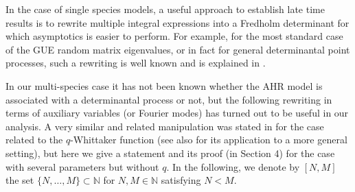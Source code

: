 \documentclass[cmp]{svjour}
\numberwithin{theorem}{section}
\numberwithin{equation}{section}
\begin{document}
In the case of single species models, a useful approach to establish late time results is to rewrite multiple integral expressions into a Fredholm determinant for which asymptotics is easier to perform. For example, for the most standard case of the GUE random matrix eigenvalues, or in fact for general determinantal point processes, such a rewriting is well known and is explained in \cite{Mehta2004random,forrester2010random,tcASEPdet,S1997}.

In our multi-species case it has not been known whether the AHR model is associated with a determinantal process or not, but the following rewriting
in terms of auxiliary variables (or Fourier modes) has turned out to be useful in our analysis.  A very similar and related manipulation was stated in \cite{IS2019} for the case related to the $q$-Whittaker function (see also \cite{IMuS2020} for its application to a more general setting), but here we give a statement and its proof (in Section 4) for the case with several parameters but without $q$.   
In the following, we denote by $[N,M]$ the set $\{ N, \dots, M \} \subset \mathbb{N}$ for $N, M \in \mathbb{N}$ satisfying $N<M$. 
\end{document}
